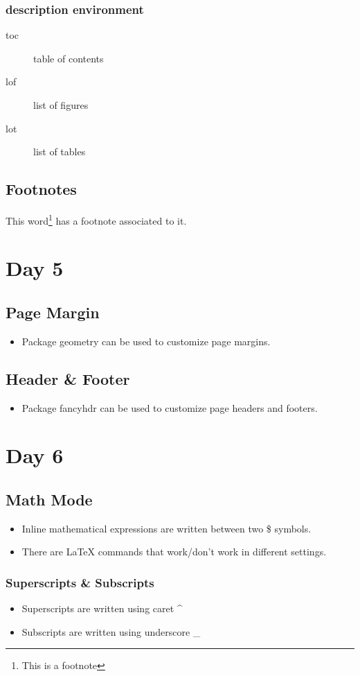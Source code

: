 \documentclass[a4paper,12pt]{article}
\begin{document}
\subsubsection*{description environment}
	\begin{description}
		\item[toc] table of contents
		\item[lof] list of figures
		\item[lot] list of tables
	\end{description}

\subsection{Footnotes}
This word\footnote{This is a footnote} has a footnote associated to it.

\section{Day 5}

\subsection{Page Margin}
\begin{itemize}
	\item Package geometry can be used to customize page margins.
\end{itemize}

\subsection{Header \& Footer}
\begin{itemize}
	\item Package fancyhdr can be used to customize page headers and footers.
\end{itemize}

\section{Day 6}

\subsection{Math Mode}
\begin{itemize}
	\item Inline mathematical expressions are written between two \$ symbols.
	\item There are \LaTeX{} commands that work/don't work in different settings.
\end{itemize}

\subsubsection*{Superscripts \& Subscripts}
\begin{itemize}
	\item Superscripts are written using caret \^{}
	\item Subscripts are written using underscore \_{}
\end{itemize}
%
%
\end{document}
